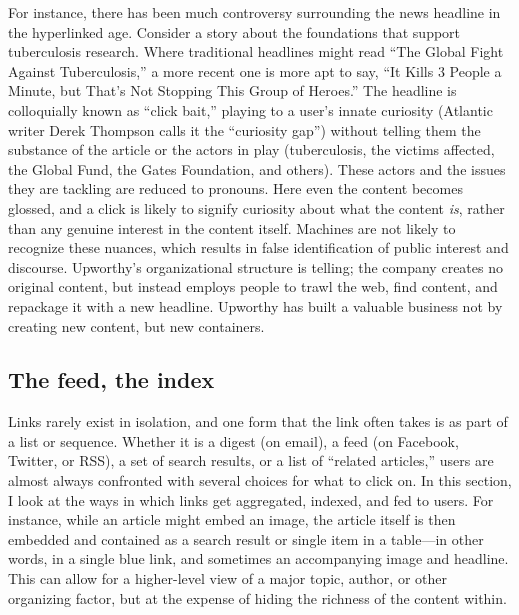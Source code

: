 For instance, there has been much controversy surrounding the news headline in the hyperlinked age. Consider a story about the foundations that support tuberculosis research. Where traditional headlines might read ``The Global Fight Against Tuberculosis,'' a more recent one is more apt to say, ``It Kills 3 People a Minute, but That's Not Stopping This Group of Heroes.''\autocite{karsch_it_2014} The headline is colloquially known as ``click bait,'' playing to a user's innate curiosity (Atlantic writer Derek Thompson calls it the ``curiosity gap'')\autocite{thompson_upworthy:_2013} without telling them the substance of the article or the actors in play (tuberculosis, the victims affected, the Global Fund, the Gates Foundation, and others). These actors and the issues they are tackling are reduced to pronouns. Here even the content becomes glossed, and a click is likely to signify curiosity about what the content \emph{is}, rather than any genuine interest in the content itself. Machines are not likely to recognize these nuances, which results in false identification of public interest and discourse. Upworthy's organizational structure is telling; the company creates no original content, but instead employs people to trawl the web, find content, and repackage it with a new headline. Upworthy has built a valuable business not by creating new content, but new containers.

\subsection{The feed, the index}

Links rarely exist in isolation, and one form that the link often takes is as part of a list or sequence. Whether it is a digest (on email), a feed (on Facebook, Twitter, or RSS), a set of search results, or a list of ``related articles,'' users are almost always confronted with several choices for what to click on. In this section, I look at the ways in which links get aggregated, indexed, and fed to users. For instance, while an article might embed an image, the article itself is then embedded and contained as a search result or single item in a table---in other words, in a single blue link, and sometimes an accompanying image and headline. This can allow for a higher-level view of a major topic, author, or other organizing factor, but at the expense of hiding the richness of the content within.

